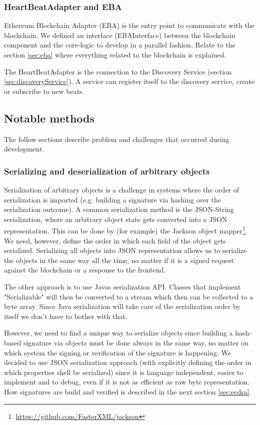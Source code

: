 \subsubsection{HeartBeatAdapter and EBA}
Ethereum Blockchain Adapter (EBA) is the entry point to communicate with the blockchain. We defined an interface (EBAInterface) between the blockchain component and the core-logic to develop in a parallel fashion. Relate to the section \ref{sec:eba} where everything related to the blockchain is explained.

The HeartBeatAdapter is the connection to the Discovery Service (section \ref{sec:discoveryService}). A service can register itself to the discovery service, create or subscribe to new beats.

\subsection{Notable methods}
The follow sections describe problem and challenges that occurred during development.

\subsubsection{Serializing and deserialization of arbitrary objects}
\label{sec:serialobject}

Serialization of arbitrary objects is a challenge in systems where the order of serialization is imported (e.g. building a signature via hashing over the serialization outcome). A common serialization method is the JSON-String serialization, where an arbitrary object state gets converted into a JSON representation. This can be done by (for example) the Jackson object mapper\footnote{\url{https://github.com/FasterXML/jackson}}. We need, however, define the order  in which each field of the object gets serialized. Serializing all objects into JSON representation allows us to serialize the objects in the same way all the time, no matter if it is a signed request against the blockchain or a response to the frontend. 

The other approach is to use Javas serialization API. Classes that implement "Serializable" will then be converted to a stream which then can be collected to a byte array. Since Java serialization will take care of the serialization order by itself we don’t have to bother with that. 

However, we need to find a unique way to serialize objects since building a hash-based signature via objects must be done always in the same way, no matter on which system the signing or verification of the signature is happening. We decided to use JSON serialization approach (with explicitly defining the order in which properties shell be serialized) since it is language independent, easier to implement and to debug, even if it is not as efficient as raw byte representation. How signatures are build and verified is described in the next section \ref{sec:ecdsa}. 

